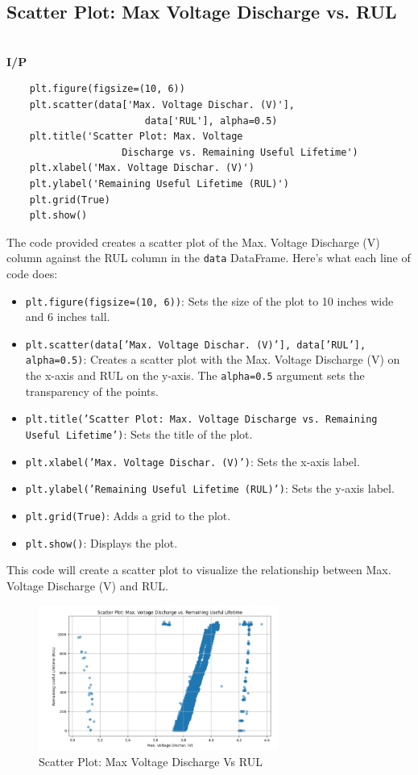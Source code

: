 \subsection{Scatter Plot: Max Voltage Discharge vs. RUL}
\\
\noindent
\textbf{I/P} \\[-2.5em] %
\begin{verbatim}
    plt.figure(figsize=(10, 6)) 
    plt.scatter(data['Max. Voltage Dischar. (V)'], 
                        data['RUL'], alpha=0.5) 
    plt.title('Scatter Plot: Max. Voltage 
                    Discharge vs. Remaining Useful Lifetime') 
    plt.xlabel('Max. Voltage Dischar. (V)') 
    plt.ylabel('Remaining Useful Lifetime (RUL)') 
    plt.grid(True) 
    plt.show()    
\end{verbatim}
The code provided creates a scatter plot of the Max. Voltage Discharge (V) column against the RUL column in the \texttt{data} DataFrame. Here’s what each line of code does:
\begin{itemize}
    \item \texttt{plt.figure(figsize=(10, 6))}: Sets the size of the plot to 10 inches wide and 6 inches tall.
    \item \texttt{plt.scatter(data['Max. Voltage Dischar. (V)'], data['RUL'], alpha=0.5)}: Creates a scatter plot with the Max. Voltage Discharge (V) on the x-axis and RUL on the y-axis. The \texttt{alpha=0.5} argument sets the transparency of the points.
    \item \texttt{plt.title('Scatter Plot: Max. Voltage Discharge vs. Remaining Useful Lifetime')}: Sets the title of the plot.
    \item \texttt{plt.xlabel('Max. Voltage Dischar. (V)')}: Sets the x-axis label.
    \item \texttt{plt.ylabel('Remaining Useful Lifetime (RUL)')}: Sets the y-axis label.
    \item \texttt{plt.grid(True)}: Adds a grid to the plot.
    \item \texttt{plt.show()}: Displays the plot.
\end{itemize}
This code will create a scatter plot to visualize the relationship between Max. Voltage Discharge (V) and RUL.
\begin{figure}[H]
    \centering
    \includegraphics[width=0.7\textwidth]{scatter_plot_max_voltage_vs_rul.jpg}
    \caption{Scatter Plot: Max Voltage Discharge Vs RUL}
    \label{fig:scatter_plot_max_voltage_vs_rul}
\end{figure}

